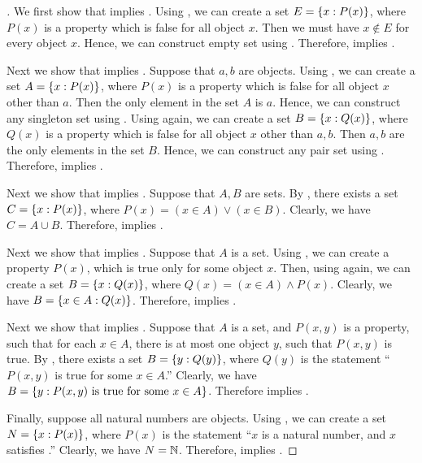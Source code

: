 \begin{proof}[]
  We first show that  implies .
  Using , we can create a set \(E = \left\lbrace x : P(x)\right\rbrace\), where \(P(x)\) is a property which is false for all object \(x\).
  Then we must have \(x \notin E\) for every object \(x\).
  Hence, we can construct empty set using .
  Therefore,  implies .

  Next we show that  implies .
  Suppose that \(a, b\) are objects.
  Using , we can create a set \(A = \left\lbrace x : P(x)\right\rbrace\), where \(P(x)\) is a property which is false for all object \(x\) other than \(a\).
  Then the only element in the set \(A\) is \(a\).
  Hence, we can construct any singleton set using .
  Using  again, we can create a set \(B = \left\lbrace x : Q(x)\right\rbrace\), where \(Q(x)\) is a property which is false for all object \(x\) other than \(a, b\).
  Then \(a, b\) are the only elements in the set \(B\).
  Hence, we can construct any pair set using .
  Therefore,  implies .

  Next we show that  implies .
  Suppose that \(A, B\) are sets.
  By , there exists a set \(C = \left\lbrace x : P(x)\right\rbrace\), where \(P(x) = (x \in A) \lor (x \in B)\).
  Clearly, we have \(C = A \cup B\).
  Therefore,  implies .

  Next we show that  implies .
  Suppose that \(A\) is a set.
  Using , we can create a property \(P(x)\), which is true only for some object \(x\).
  Then, using  again, we can create a set \(B = \left\lbrace x : Q(x)\right\rbrace\), where \(Q(x) = (x \in A) \land P(x)\).
  Clearly, we have \(B = \left\lbrace x \in A : Q(x)\right\rbrace\).
  Therefore,  implies .

  Next we show that  implies .
  Suppose that \(A\) is a set, and \(P(x, y)\) is a property, such that for each \(x \in A\), there is at most one object \(y\), such that \(P(x, y)\) is true.
  By , there exists a set \(B = \left\lbrace y : Q(y)\right\rbrace\), where \(Q(y)\) is the statement ``\(P(x, y)\) is true for some \(x \in A\).''
  Clearly, we have \(B = \left\lbrace y : P(x, y) \text{ is true for some } x \in A\right\rbrace\).
  Therefore  implies .

  Finally, suppose all natural numbers are objects.
  Using , we can create a set \(N = \left\lbrace x : P(x)\right\rbrace\), where \(P(x)\) is the statement ``\(x\) is a natural number, and \(x\) satisfies .''
  Clearly, we have \(N = \mathbb{N}\).
  Therefore,  implies .
\end{proof}

